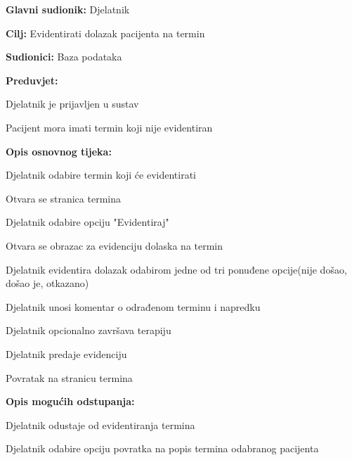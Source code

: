 				\begin{packed_item}
					
					\item \textbf{Glavni sudionik: }Djelatnik
					\item  \textbf{Cilj: }Evidentirati dolazak pacijenta na termin 
					\item  \textbf{Sudionici: }Baza podataka
					\item  \textbf{Preduvjet: }
					\item[] \begin{packed_enum}
						
						\item[-] Djelatnik je prijavljen u sustav
						\item[-] Pacijent mora imati termin koji nije evidentiran
					\end{packed_enum}
					\item  \textbf{Opis osnovnog tijeka: }
					
					\item[] \begin{packed_enum}
						\item Djelatnik odabire termin koji će evidentirati
						\item Otvara se stranica termina
						\item Djelatnik odabire opciju "Evidentiraj"
						\item Otvara se obrazac za evidenciju dolaska na termin
						\item Djelatnik evidentira dolazak odabirom jedne od tri ponuđene opcije(nije došao, došao je, otkazano)
						\item Djelatnik unosi komentar o odrađenom terminu i napredku
						\item Djelatnik opcionalno završava terapiju
						\item Djelatnik predaje evidenciju
						\item Povratak na stranicu termina
					\end{packed_enum}
					
					\item  \textbf{Opis mogućih odstupanja:}
					
					\item[] \begin{packed_item}
						
						\item[3.a] Djelatnik odustaje od evidentiranja termina
						\item[] \begin{packed_enum}
							\item Djelatnik odabire opciju povratka na popis termina odabranog pacijenta
							

\end{packed_enum}
\end{packed_item}
\end{packed_item}
